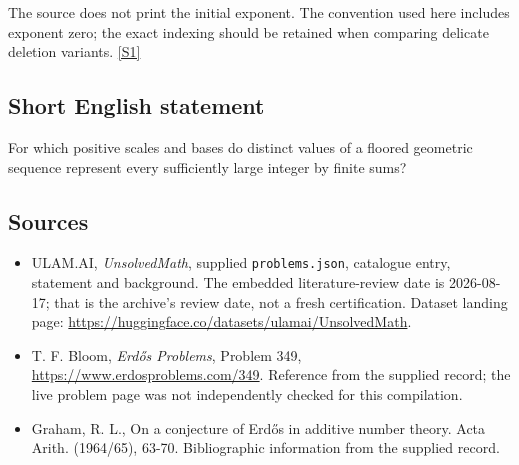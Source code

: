 \documentclass[11pt,a4paper]{article}
\newcommand{\sref}[2]{\hyperlink{source:#1:#2}{[S#2]}}
\begin{document}
The source does not print the initial exponent. The convention used here includes exponent zero; the exact indexing should be retained when comparing delicate deletion variants. \sref{statement}{1}

\subsection{Short English statement}

For which positive scales and bases do distinct values of a floored geometric sequence represent every sufficiently large integer by finite sums?

\subsection{Sources}

{\small

\begin{itemize}

\item[\hypertarget{source:statement:1}{S1}] ULAM.AI, \emph{UnsolvedMath}, supplied \texttt{problems.json}, catalogue entry, statement and background. The embedded literature-review date is 2026-08-17; that is the archive’s review date, not a fresh certification. Dataset landing page: \url{https://huggingface.co/datasets/ulamai/UnsolvedMath}.

\item[\hypertarget{source:statement:2}{S2}] T. F. Bloom, \emph{Erdős Problems}, Problem 349, \url{https://www.erdosproblems.com/349}. Reference from the supplied record; the live problem page was not independently checked for this compilation.

\item[\hypertarget{source:statement:3}{S3}] Graham, R. L., On a conjecture of Erd\H{o}s in additive number theory. Acta Arith. (1964/65), 63-70. Bibliographic information from the supplied record.

\end{itemize}

}

\label{end:statement}
\end{document}
